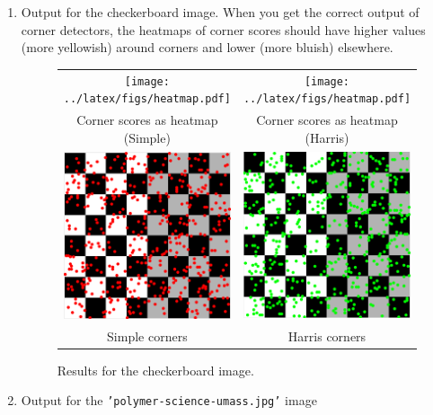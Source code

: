 \documentclass[10pt,letterpaper]{article}
\newcommand{\cmd}[1] {{\color{blue}\texttt{#1}}}
\begin{document}
\begin{enumerate}
\item Output for the checkerboard image. When you get the correct output of corner detectors, the heatmaps of corner scores should have higher values (more yellowish) around corners and lower (more bluish) elsewhere.

\begin{figure}[h]
\begin{tabular}{cc}
\texttt{[image: ../latex/figs/heatmap.pdf]} &
\texttt{[image: ../latex/figs/heatmap.pdf]} \\
 Corner scores as heatmap (Simple) & Corner scores as heatmap (Harris) \\
\includegraphics[width=0.48\linewidth]{../latex/figs/checker_simple_corner.png} &
\includegraphics[width=0.48\linewidth]{../latex/figs/checker_harris.png} \\
 Simple corners & Harris corners  \\
\end{tabular}
\caption{\label{fig:checker} Results for the checkerboard image.}
\end{figure}

\newpage

\item Output for the \cmd{'polymer-science-umass.jpg'} image


\end{enumerate}
\end{document}
